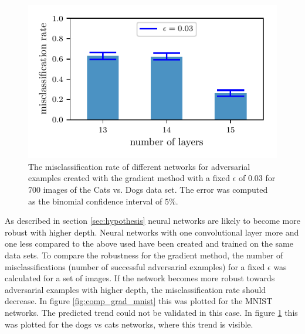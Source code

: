 \documentclass[%
 reprint,
 amsmath,amssymb,
 aps,
]{revtex4-1}
\begin{document}
\begin{figure}
\centering
\showthe\columnwidth
\includegraphics[width = 1\linewidth]{figures/cvd_grad_misclassificationrate.pdf}
\caption{The misclassification rate of different networks for adversarial examples created with the gradient method with a fixed $\epsilon$ of 0.03 for 700 images of the Cats vs. Dogs data set. The error was computed as the binomial confidence interval of $5\%$. }
\label{fig:comp_grad_cats_vs_dogs}
\end{figure}

As described in section \ref{sec:hypothesis} neural networks are likely to become more robust with higher depth. Neural networks with one convolutional layer more and one less compared to the above used have been created and trained on the same data sets. To compare the robustness for the gradient method, the number of misclassifications (number of successful adversarial examples) for a fixed $\epsilon$ was calculated for a set of images. If the network becomes more robust towards adversarial examples with higher depth, the misclassification rate should decrease. In figure \ref{fig:comp_grad_mnist} this was plotted for the MNIST networks. The predicted trend could not be validated in this case. In figure \ref{fig:comp_grad_cats_vs_dogs} this was plotted for the dogs vs cats networks, where this trend is visible. 
\end{document}
